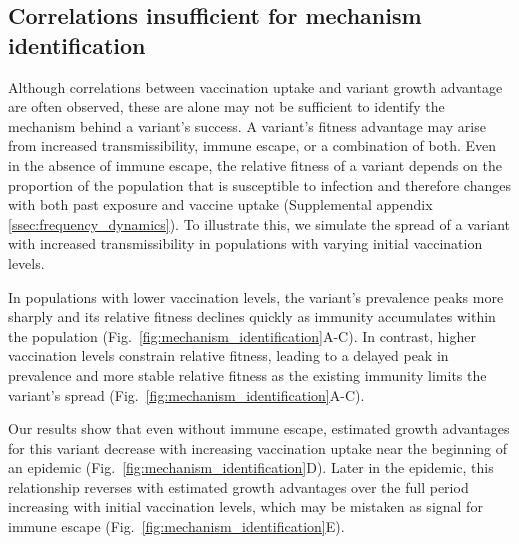 \documentclass[11pt,oneside,letterpaper]{article}
\begin{document}
\subsection*{Correlations insufficient for mechanism identification}

Although correlations between vaccination uptake and variant growth advantage are often observed, these are alone may not be sufficient to identify the mechanism behind a variant's success.
A variant’s fitness advantage may arise from increased transmissibility, immune escape, or a combination of both.
Even in the absence of immune escape, the relative fitness of a variant depends on the proportion of the population that is susceptible to infection and therefore changes with both past exposure and vaccine uptake (Supplemental appendix \ref{ssec:frequency_dynamics}).
To illustrate this, we simulate the spread of a variant with increased transmissibility in populations with varying initial vaccination levels.

In populations with lower vaccination levels, the variant’s prevalence peaks more sharply and its relative fitness declines quickly as immunity accumulates within the population (Fig.~\ref{fig:mechanism_identification}A-C). 
In contrast, higher vaccination levels constrain relative fitness, leading to a delayed peak in prevalence and more stable relative fitness as the existing immunity limits the variant’s spread (Fig.~\ref{fig:mechanism_identification}A-C). 

Our results show that even without immune escape, estimated growth advantages for this variant decrease with increasing vaccination uptake near the beginning of an epidemic (Fig.~\ref{fig:mechanism_identification}D).
Later in the epidemic, this relationship reverses with estimated growth advantages over the full period increasing with initial vaccination levels, which may be mistaken as signal for immune escape (Fig.~\ref{fig:mechanism_identification}E).

\end{document}

